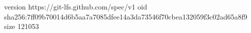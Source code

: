 version https://git-lfs.github.com/spec/v1
oid sha256:7ff09b70014d6b5aa7a7085dfee14a3da73546f70cbea132059f3c02ad65a8f9
size 121053
